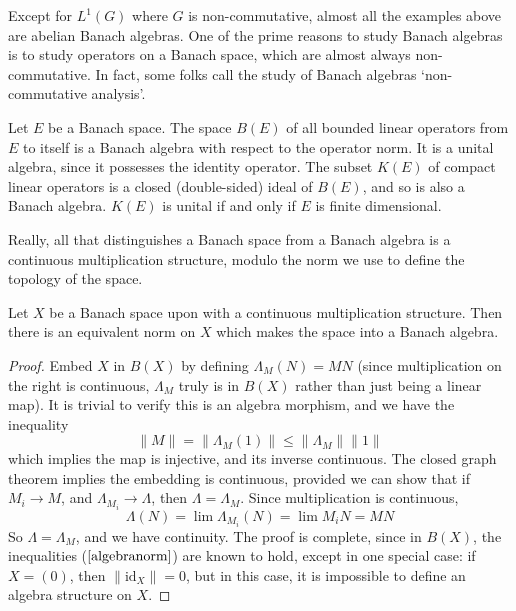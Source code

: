 Except for $L^1(G)$ where $G$ is non-commutative, almost all the examples above are abelian Banach algebras. One of the prime reasons to study Banach algebras is to study operators on a Banach space, which are almost always non-commutative. In fact, some folks call the study of Banach algebras `non-commutative analysis'.

\begin{example}
    Let $E$ be a Banach space. The space $B(E)$ of all bounded linear operators from $E$ to itself is a Banach algebra with respect to the operator norm. It is a unital algebra, since it possesses the identity operator. The subset $K(E)$ of compact linear operators is a closed (double-sided) ideal of $B(E)$, and so is also a Banach algebra. $K(E)$ is unital if and only if $E$ is finite dimensional.
\end{example}

Really, all that distinguishes a Banach space from a Banach algebra is a continuous multiplication structure, modulo the norm we use to define the topology of the space.

\begin{prop}
    Let $X$ be a Banach space upon with a continuous multiplication structure. Then there is an equivalent norm on $X$ which makes the space into a Banach algebra.
\end{prop}
\begin{proof}
    Embed $X$ in $B(X)$ by defining $\Lambda_M(N) = MN$ (since multiplication on the right is continuous, $\Lambda_M$ truly is in $B(X)$ rather than just being a linear map). It is trivial to verify this is an algebra morphism, and we have the inequality
    \begin{equation} \label{embedinequality} \| M \| = \| \Lambda_M (1) \| \leq \| \Lambda_M \| \| 1 \| \end{equation}
    which implies the map is injective, and its inverse continuous. The closed graph theorem implies the embedding is continuous, provided we can show that if $M_i \to M$, and $\Lambda_{M_i} \to \Lambda$, then $\Lambda = \Lambda_M$. Since multiplication is continuous,
    \[ \Lambda(N) = \lim \Lambda_{M_i}(N) = \lim M_iN = MN \]
    So $\Lambda = \Lambda_M$, and we have continuity. The proof is complete, since in $B(X)$, the inequalities ($\ref{algebranorm}$) are known to hold, except in one special case: if $X = (0)$, then $\| \text{id}_X \| = 0$, but in this case, it is impossible to define an algebra structure on $X$.
\end{proof}

